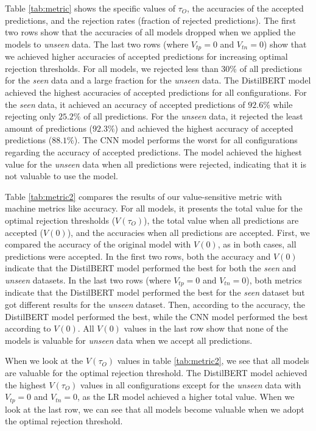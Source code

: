 %
Table \ref{tab:metric} shows the specific values of $\tau_O$, the accuracies of the accepted predictions, and the rejection rates (fraction of rejected predictions).
%
The first two rows show that the accuracies of all models dropped when we applied the models to \emph{unseen} data.
%
The last two rows (where $V_{tp}=0$ and $V_{tn}=0$) show that we achieved higher accuracies of accepted predictions for increasing optimal rejection thresholds.
%
For all models, we rejected less than 30\% of all predictions for the \emph{seen} data and a large fraction for the \emph{unseen} data.
%
The DistilBERT model achieved the highest accuracies of accepted predictions for all configurations.
%
For the \emph{seen} data, it achieved an accuracy of accepted predictions of $92.6\%$ while rejecting only $25.2\%$ of all predictions.
%
For the \emph{unseen} data, it rejected the least amount of predictions ($92.3\%$) and achieved the highest accuracy of accepted predictions ($88.1\%$).
%
The CNN model performs the worst for all configurations regarding the accuracy of accepted predictions.
%
The model achieved the highest value for the \emph{unseen} data when all predictions were rejected, indicating that it is not valuable to use the model.

%
Table \ref{tab:metric2} compares the results of our value-sensitive metric with machine metrics like accuracy.
%
For all models, it presents the total value for the optimal rejection thresholds ($V(\tau_O)$), the total value when all predictions are accepted ($V(0)$), and the accuracies when all predictions are accepted.
%
First, we compared the accuracy of the original model with $V(0)$, as in both cases, all predictions were accepted.
%
In the first two rows, both the accuracy and $V(0)$ indicate that the DistilBERT model performed the best for both the \emph{seen} and \emph{unseen} datasets.
%
In the last two rows (where $V_{tp}=0$ and $V_{tn}=0$), both metrics indicate that the DistilBERT model performed the best for the \emph{seen} dataset but got different results for the \emph{unseen} dataset.
%
Then, according to the accuracy, the DistilBERT model performed the best, while the CNN model performed the best according to $V(0)$.
%
All $V(0)$ values in the last row show that none of the models is valuable for \emph{unseen} data when we accept all predictions.
%

%
When we look at the $V(\tau_O)$ values in table \ref{tab:metric2}, we see that all models are valuable for the optimal rejection threshold.
%
The DistilBERT model achieved the highest $V(\tau_O)$ values in all configurations except for the \emph{unseen} data with $V_{tp}=0$ and $V_{tn}=0$, as the LR model achieved a higher total value.
%
When we look at the last row, we can see that all models become valuable when we adopt the optimal rejection threshold.

